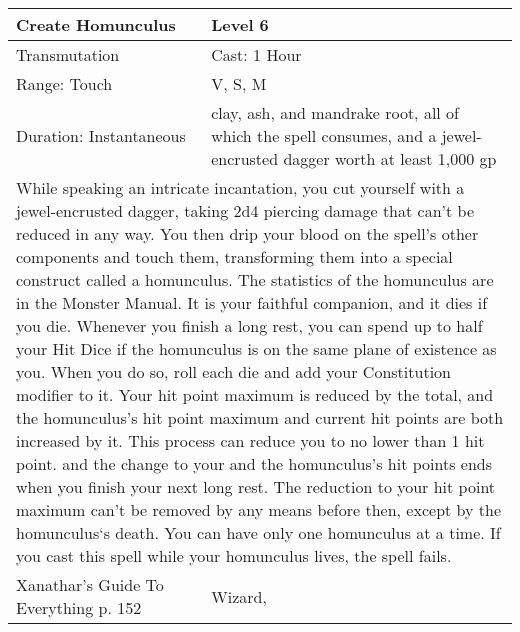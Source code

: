 \documentclass[11pt]{report}
\begin{document}
\begin{table}[H]
	\begin{tabular}{||p{6cm}|p{6cm}||}
		\hline\hline
		\bf{Create Homunculus} & Level 6\\ \hline
		Transmutation & Cast: 1 Hour\\ \hline
		Range: Touch & V, S, M\\ \hline
		Duration: Instantaneous & clay, ash, and mandrake root, all of which the spell consumes, and a jewel-encrusted dagger worth at least 1,000 gp\\ \hline
		\multicolumn{2}{||p{12cm}||}{While speaking an intricate incantation, you cut yourself with a jewel-encrusted dagger, taking 2d4 piercing damage that can’t be reduced in any way. You then drip your blood on the spell’s other components and touch them, transforming them into a special construct called a homunculus. The statistics of the homunculus are in the Monster Manual. It is your faithful companion, and it dies if you die. Whenever you finish a long rest, you can spend up to half your Hit Dice if the homunculus is on the same plane of existence as you. When you do so, roll each die and add your Constitution modifier to it. Your hit point maximum is reduced by the total, and the homunculus’s hit point maximum and current hit points are
both increased by it. This process can reduce you to no lower than 1 hit point. and the change to your and the homunculus’s hit points ends when you finish your next long rest. The reduction to your hit point maximum can’t be removed by any means before then, except by the homunculus‘s death. You can have only one homunculus at a time. If you cast this spell while your homunculus lives, the spell fails.}\\ \hline
Xanathar's Guide To Everything p. 152 & Wizard, \\ \hline\hline
	\end{tabular}
\end{table}
\end{document}
